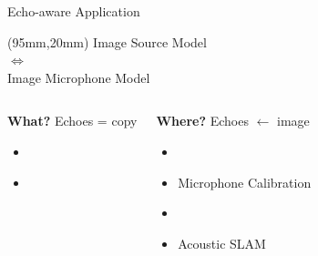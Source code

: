 \begin{frame}[t]{Echo-aware Application \hfill\faBook}
    \begin{textblock*}{30mm}(95mm,20mm)
        \centering
        \small
        \textcolor{myred}{%
            Image Source Model
            \\$\Leftrightarrow$
            \\Image Microphone Model}
    \end{textblock*}

    \begin{columns}[T,onlytextwidth]
        \begin{block}{\textbf{What?}}
            \small
            Echoes = copy
            \begin{itemize}
                \item {}
                \\{\footnotesize\cite{leglaive2016multichannel}}
                \item {}
                \\{\footnotesize\cite{flanagan1993spatially,dokmanic2015raking,kowalczyk2019raking}}
            \end{itemize}
        \end{block}
        \begin{block}{\textbf{Where?}}
            \small
            Echoes $\gets$ image
            \begin{itemize}
                \item {}
                \\{\footnotesize\cite{ribeiro2010turning,jensen2019method}}
                \item Microphone Calibration
                \\{\footnotesize\cite{dokmanic2015raking,salvati2016sound}}
                \item {}
                \\{\footnotesize\cite{antonacci2012inferences,crocco2017uncalibrated}}
                \item Acoustic SLAM
                \\{\footnotesize\cite{evers2018acoustic,krekovic2016echoslam}}
            \end{itemize}
        \end{block}

\end{columns}
\end{frame}
